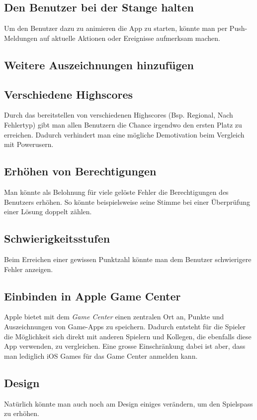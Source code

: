 \subsection{Den Benutzer bei der Stange halten}
Um den Benutzer dazu zu animieren die App zu starten, könnte man per Push-Meldungen auf aktuelle Aktionen oder Ereignisse aufmerksam machen.

\subsection{Weitere Auszeichnungen hinzufügen}

\subsection{Verschiedene Highscores}
Durch das bereitstellen von verschiedenen Highscores (Bsp. Regional, Nach Fehlertyp) gibt man allen Benutzern die Chance irgendwo den ersten Platz zu erreichen.
Dadurch verhindert man eine mögliche Demotivation beim Vergleich mit Powerusern.

\subsection{Erhöhen von Berechtigungen}
Man könnte als Belohnung für viele gelöste Fehler die Berechtigungen des Benutzers erhöhen. So könnte beispielsweise seine Stimme bei einer Überprüfung einer Lösung doppelt zählen. 

\subsection{Schwierigkeitsstufen}
Beim Erreichen einer gewissen Punktzahl könnte man dem Benutzer schwierigere Fehler anzeigen.

\subsection{Einbinden in Apple Game Center}
Apple bietet mit dem \emph{Game Center} einen zentralen Ort an, Punkte und Auszeichnungen von Game-Apps zu speichern.
Dadurch entsteht für die Spieler die Möglichkeit sich direkt mit anderen Spielern und Kollegen, die ebenfalls diese App verwenden, zu vergleichen.
Eine grosse Einschränkung dabei ist aber, dass man lediglich iOS Games für das Game Center anmelden kann.

\subsection{Design}
Natürlich könnte man auch noch am Design einiges verändern, um den Spielspass zu erhöhen.